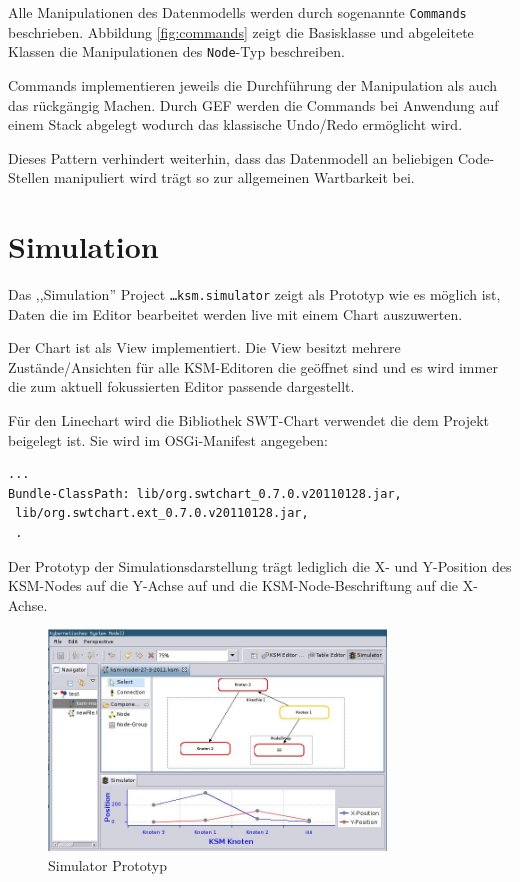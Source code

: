 \documentclass[%
12pt,titlepage,abstracton,DIV=10,BCOR=0.5cm]{scrreprt}
\begin{document}
Alle Manipulationen des Datenmodells werden durch sogenannte \texttt{Commands}
beschrieben. Abbildung \ref{fig:commands} zeigt die Basisklasse und abgeleitete
Klassen die Manipulationen des \texttt{Node}-Typ beschreiben.

Commands implementieren jeweils die Durchführung der Manipulation als auch das
rückgängig Machen. Durch GEF werden die Commands bei Anwendung auf einem Stack
abgelegt wodurch das klassische Undo/Redo ermöglicht wird.

Dieses Pattern verhindert weiterhin, dass das Datenmodell an beliebigen
Code-Stellen manipuliert wird trägt so zur allgemeinen Wartbarkeit bei.










\section{Simulation}
Das ,,Simulation'' Project \texttt{\ldots ksm.simulator} zeigt als Prototyp wie
es möglich ist, Daten die im Editor bearbeitet werden live mit einem Chart
auszuwerten.

Der Chart ist als View implementiert. Die View besitzt mehrere
Zustände/Ansichten für alle KSM-Editoren die geöffnet sind und es wird immer die
zum aktuell fokussierten Editor passende dargestellt.

Für den Linechart wird die Bibliothek SWT-Chart verwendet die dem Projekt
beigelegt ist. Sie wird im OSGi-Manifest angegeben:
{\small\begin{verbatim}
...
Bundle-ClassPath: lib/org.swtchart_0.7.0.v20110128.jar,
 lib/org.swtchart.ext_0.7.0.v20110128.jar,
 .
\end{verbatim}}

Der Prototyp der Simulationsdarstellung trägt lediglich die X- und Y-Position
des KSM-Nodes auf die Y-Achse auf und die KSM-Node-Beschriftung auf die X-Achse.

\begin{figure}[ht!]
\centering
\includegraphics[width=0.8\textwidth]{images/eclipse-simulator.jpg}
\caption{Simulator Prototyp}
\label{fig:eclipse-simulator}
\end{figure}
\end{document}
